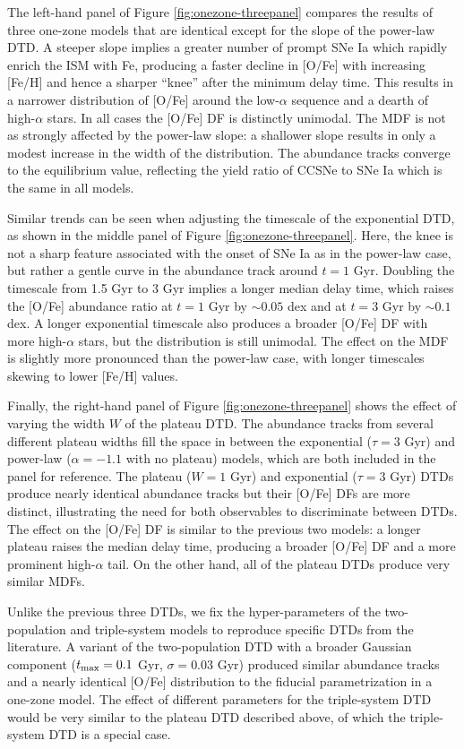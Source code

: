 \documentclass[twocolumn,twocolappendix]{aastex631}
\begin{document}
The left-hand panel of Figure \ref{fig:onezone-threepanel} compares the results of three one-zone models that are identical except for the slope of the power-law DTD. A steeper slope implies a greater number of prompt SNe Ia which rapidly enrich the ISM with Fe, producing a faster decline in [O/Fe] with increasing [Fe/H] and hence a sharper ``knee'' after the minimum delay time. This results in a narrower distribution of [O/Fe] around the low-$\alpha$ sequence and a dearth of high-$\alpha$ stars. In all cases the [O/Fe] DF is distinctly unimodal. The MDF is not as strongly affected by the power-law slope: a shallower slope results in only a modest increase in the width of the distribution. The abundance tracks converge to the equilibrium value, reflecting the yield ratio of CCSNe to SNe Ia which is the same in all models.

Similar trends can be seen when adjusting the timescale of the exponential DTD, as shown in the middle panel of Figure \ref{fig:onezone-threepanel}. Here, the knee is not a sharp feature associated with the onset of SNe Ia as in the power-law case, but rather a gentle curve in the abundance track around $t=1$ Gyr. Doubling the timescale from 1.5 Gyr to 3 Gyr implies a longer median delay time, which raises the [O/Fe] abundance ratio at $t=1$ Gyr by $\sim0.05$ dex and at $t=3$ Gyr by $\sim0.1$ dex. A longer exponential timescale also produces a broader [O/Fe] DF with more high-$\alpha$ stars, but the distribution is still unimodal. The effect on the MDF is slightly more pronounced than the power-law case, with longer timescales skewing to lower [Fe/H] values.

Finally, the right-hand panel of Figure \ref{fig:onezone-threepanel} shows the effect of varying the width $W$ of the plateau DTD. The abundance tracks from several different plateau widths fill the space in between the exponential ($\tau=3$ Gyr) and power-law ($\alpha=-1.1$ with no plateau) models, which are both included in the panel for reference. The plateau ($W=1$ Gyr) and exponential ($\tau=3$ Gyr) DTDs produce nearly identical abundance tracks but their [O/Fe] DFs are more distinct, illustrating the need for both observables to discriminate between DTDs. The effect on the [O/Fe] DF is similar to the previous two models: a longer plateau raises the median delay time, producing a broader [O/Fe] DF and a more prominent high-$\alpha$ tail. On the other hand, all of the plateau DTDs produce very similar MDFs.

Unlike the previous three DTDs, we fix the hyper-parameters of the two-population and triple-system models to reproduce specific DTDs from the literature. A variant of the two-population DTD with a broader Gaussian component ($t_{\rm max}=0.1$ Gyr, $\sigma=0.03$ Gyr) produced similar abundance tracks and a nearly identical [O/Fe] distribution to the fiducial parametrization in a one-zone model. The effect of different parameters for the triple-system DTD would be very similar to the plateau DTD described above, of which the triple-system DTD is a special case.
\end{document}
